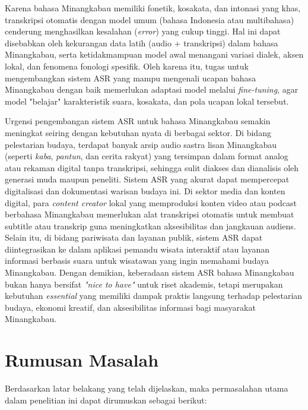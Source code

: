 Karena bahasa Minangkabau memiliki fonetik, kosakata, dan intonasi yang khas, transkripsi otomatis dengan model umum (bahasa Indonesia atau multibahasa) cenderung menghasilkan kesalahan (\textit{error}) yang cukup tinggi. Hal ini dapat disebabkan oleh kekurangan data latih (audio + transkripsi) dalam bahasa Minangkabau, serta ketidakmampuan model awal menangani variasi dialek, aksen lokal, dan fenomena fonologi spesifik. Oleh karena itu, tugas untuk mengembangkan sistem ASR yang mampu mengenali ucapan bahasa Minangkabau dengan baik memerlukan adaptasi model melalui \textit{fine-tuning}, agar model "belajar" karakteristik suara, kosakata, dan pola ucapan lokal tersebut. \par

Urgensi pengembangan sistem ASR untuk bahasa Minangkabau semakin meningkat seiring dengan kebutuhan nyata di berbagai sektor. Di bidang pelestarian budaya, terdapat banyak arsip audio sastra lisan Minangkabau (seperti \textit{kaba}, \textit{pantun}, dan cerita rakyat) yang tersimpan dalam format analog atau rekaman digital tanpa transkripsi, sehingga sulit diakses dan dianalisis oleh generasi muda maupun peneliti. Sistem ASR yang akurat dapat mempercepat digitalisasi dan dokumentasi warisan budaya ini. Di sektor media dan konten digital, para \textit{content creator} lokal yang memproduksi konten video atau podcast berbahasa Minangkabau memerlukan alat transkripsi otomatis untuk membuat subtitle atau transkrip guna meningkatkan aksesibilitas dan jangkauan audiens. Selain itu, di bidang pariwisata dan layanan publik, sistem ASR dapat diintegrasikan ke dalam aplikasi pemandu wisata interaktif atau layanan informasi berbasis suara untuk wisatawan yang ingin memahami budaya Minangkabau. Dengan demikian, keberadaan sistem ASR bahasa Minangkabau bukan hanya bersifat \textit{"nice to have"} untuk riset akademis, tetapi merupakan kebutuhan \textit{essential} yang memiliki dampak praktis langsung terhadap pelestarian budaya, ekonomi kreatif, dan aksesibilitas informasi bagi masyarakat Minangkabau. \par

\section{Rumusan Masalah} \label{I.Rumusan Masalah}
Berdasarkan latar belakang yang telah dijelaskan, maka permasalahan utama dalam penelitian ini dapat dirumuskan sebagai berikut:

